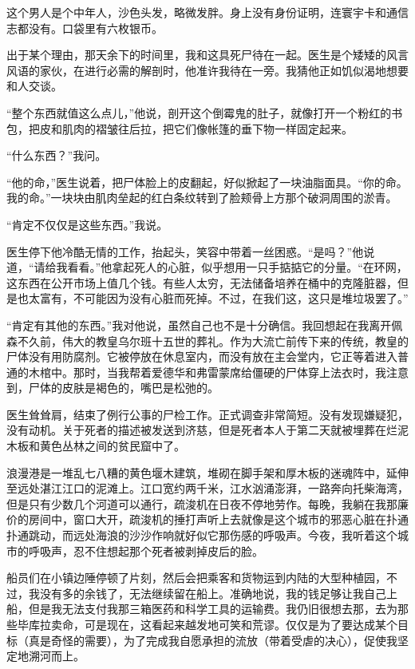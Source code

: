\documentclass[AutoFakeBold=true]{book}
\begin{document}
这个男人是个中年人，沙色头发，略微发胖。身上没有身份证明，连寰宇卡和通信志都没有。口袋里有六枚银币。

出于某个理由，那天余下的时间里，我和这具死尸待在一起。医生是个矮矮的风言风语的家伙，在进行必需的解剖时，他准许我待在一旁。我猜他正如饥似渴地想要和人交谈。

``整个东西就值这么点儿，''他说，剖开这个倒霉鬼的肚子，就像打开一个粉红的书包，把皮和肌肉的褶皱往后拉，把它们像帐篷的垂下物一样固定起来。

``什么东西？''我问。

``他的命，''医生说着，把尸体脸上的皮翻起，好似掀起了一块油脂面具。``你的命。我的命。''一块块由肌肉垒起的红白条纹转到了脸颊骨上方那个破洞周围的淤青。

``肯定不仅仅是这些东西。''我说。

医生停下他冷酷无情的工作，抬起头，笑容中带着一丝困惑。``是吗？''他说道，``请给我看看。''他拿起死人的心脏，似乎想用一只手掂掂它的分量。``在环网，这东西在公开市场上值几个钱。有些人太穷，无法储备培养在桶中的克隆脏器，但是也太富有，不可能因为没有心脏而死掉。不过，在我们这，这只是堆垃圾罢了。''

``肯定有其他的东西。''我对他说，虽然自己也不是十分确信。我回想起在我离开佩森不久前，伟大的教皇乌尔班十五世的葬礼。作为大流亡前传下来的传统，教皇的尸体没有用防腐剂。它被停放在休息室内，而没有放在主会堂内，它正等着进入普通的木棺中。那时，当我帮着爱德华和弗雷蒙席给僵硬的尸体穿上法衣时，我注意到，尸体的皮肤是褐色的，嘴巴是松弛的。

医生耸耸肩，结束了例行公事的尸检工作。正式调查非常简短。没有发现嫌疑犯，没有动机。关于死者的描述被发送到济慈，但是死者本人于第二天就被埋葬在烂泥木板和黄色丛林之间的贫民窟中了。

浪漫港是一堆乱七八糟的黄色堰木建筑，堆砌在脚手架和厚木板的迷魂阵中，延伸至远处湛江江口的泥滩上。江口宽约两千米，江水汹涌澎湃，一路奔向托柴海湾，但是只有少数几个河道可以通行，疏浚机在日夜不停地劳作。每晚，我躺在我那廉价的房间中，窗口大开，疏浚机的捶打声听上去就像是这个城市的邪恶心脏在扑通扑通跳动，而远处海浪的沙沙作响就好似它那伤感的呼吸声。今夜，我听着这个城市的呼吸声，忍不住想起那个死者被剥掉皮后的脸。

船员们在小镇边陲停顿了片刻，然后会把乘客和货物运到内陆的大型种植园，不过，我没有多的余钱了，无法继续留在船上。准确地说，我的钱足够让我自己上船，但是我无法支付我那三箱医药和科学工具的运输费。我仍旧很想去那，去为那些毕库拉卖命，可是现在，这看起来越发地可笑和荒谬。仅仅是为了要达成某个目标（真是奇怪的需要），为了完成我自愿承担的流放（带着受虐的决心），促使我坚定地溯河而上。
\end{document}
